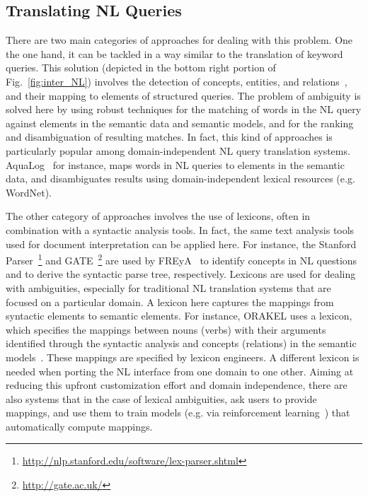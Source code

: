 \subsection{Translating NL Queries} There are two main categories of approaches for dealing with this problem. One the one hand, it can be tackled in a way similar to the translation of keyword queries. This solution (depicted in the bottom right portion of Fig.~\ref{fig:inter_NL}) involves the detection of concepts, entities, and relations~\cite{DBLP:conf/aswc/CaoCT08}, and their mapping to elements of structured queries. The problem of ambiguity is solved here by using robust techniques for the matching of words in the NL query against elements in the semantic data and semantic models, and for the ranking and disambiguation of resulting matches. In fact, this kind of approaches is particularly popular among domain-independent NL query translation systems. AquaLog~\cite{DBLP:journals/ws/LopezUMP07} for instance, maps words in NL queries to elements in the semantic data, and disambiguates results using domain-independent lexical resources (e.g. WordNet). 

The other category of approaches involves the use of lexicons, often in combination with a syntactic analysis tools. 
In fact, the same text analysis tools used for document interpretation can be applied here. For instance, the Stanford Parser~\footnote{\url{http://nlp.stanford.edu/software/lex-parser.shtml}} and GATE~\footnote{\url{http://gate.ac.uk/}} are used by FREyA~\cite{DBLP:conf/esws/DamljanovicAC10} to identify concepts in NL questions and to derive the syntactic parse tree, respectively. Lexicons are used for dealing with ambiguities, especially for traditional NL translation systems that are focused on a particular domain. A lexicon here captures the mappings from syntactic elements to semantic elements. For instance, ORAKEL uses a lexicon, which specifies the mappings between nouns (verbs) with their arguments identified through the syntactic analysis and concepts (relations) in the semantic models~\cite{DBLP:journals/dke/CimianoHHMS08}. These mappings are specified by lexicon engineers. A different lexicon is needed when porting the NL interface from one domain to one other. Aiming at reducing this upfront customization effort and domain independence, there are also systems that in the case of lexical ambiguities, ask users to provide mappings, and use them to train models (e.g. via reinforcement learning~\cite{DBLP:conf/esws/DamljanovicAC10}) that automatically compute mappings. 

